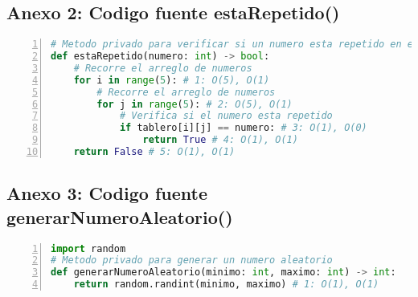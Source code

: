 \documentclass[10pt,twocolumn]{article}
\begin{document}
\subsection{Anexo 2: Codigo fuente estaRepetido()}

\begin{lstlisting}[language=python, caption={Algoritmo estaRepetido}, label={estaRepetido}, captionpos=b, basicstyle=\footnotesize\ttfamily, numbers=left, numberstyle=\tiny, numbersep=5pt, stepnumber=1, numberblanklines=true, frame=single, framesep=2mm, rulesepcolor=\color{black}]
# Metodo privado para verificar si un numero esta repetido en el tablero
def estaRepetido(numero: int) -> bool:
	# Recorre el arreglo de numeros
	for i in range(5): # 1: O(5), O(1)
		# Recorre el arreglo de numeros
		for j in range(5): # 2: O(5), O(1)
			# Verifica si el numero esta repetido
			if tablero[i][j] == numero: # 3: O(1), O(0)
				return True # 4: O(1), O(1)
	return False # 5: O(1), O(1)
\end{lstlisting}



\subsection{Anexo 3: Codigo fuente generarNumeroAleatorio()}
\begin{lstlisting}[language=python, caption={Algoritmo generarNumeroAleatorio}, label={generarNumeroAleatorio}, captionpos=b, basicstyle=\footnotesize\ttfamily, numbers=left, numberstyle=\tiny, numbersep=5pt, stepnumber=1, numberblanklines=true, frame=single, framesep=2mm, rulesepcolor=\color{black}]
import random
# Metodo privado para generar un numero aleatorio
def generarNumeroAleatorio(minimo: int, maximo: int) -> int:
	return random.randint(minimo, maximo) # 1: O(1), O(1)
\end{lstlisting}
\end{document}
